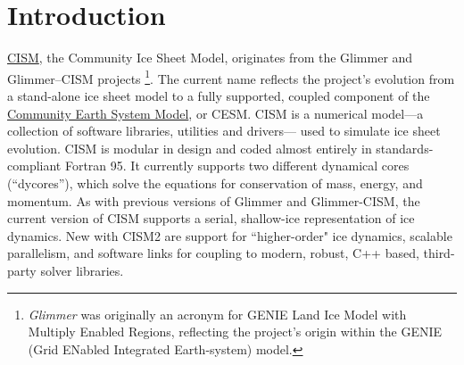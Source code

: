 
\section{Introduction}
%
\href{http://oceans11.lanl.gov/cism/}{CISM}, 
the Community Ice Sheet Model, originates from the Glimmer and Glimmer--CISM 
projects \citep{Rutt2009}\footnote{
{\it Glimmer} was originally an acronym for GENIE Land Ice Model with Multiply Enabled Regions,
reflecting the project's origin within the GENIE (Grid ENabled Integrated Earth-system) model.}.
The current name reflects
the project's evolution from a stand-alone ice sheet model to a fully supported, 
coupled component of the \href{http://www2.cesm.ucar.edu/}{Community Earth System Model}, or CESM. 
CISM is a numerical model---a collection of software libraries, utilities and drivers---
used to simulate ice sheet evolution. CISM is modular in design and coded almost 
entirely in standards-compliant Fortran 95. It currently supports two different 
dynamical cores (``dycores''), which solve the equations for conservation of mass, energy, and momentum. 
As with previous versions of Glimmer and Glimmer-CISM, the current version of CISM 
supports a serial, shallow-ice representation of ice dynamics. 
New with CISM2 are support for ``higher-order" ice dynamics, scalable parallelism, 
and software links for coupling to modern, robust, C++ based, third-party solver libraries. 

%
